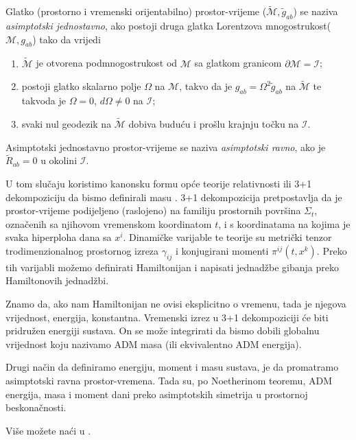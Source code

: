 \begin{mydef*}
Glatko (prostorno i vremenski orijentabilno) prostor-vrijeme ($\tilde{\mathcal{M}},\tilde{g}_{ab}$) se naziva \textit{asimptotski jednostavno}, ako postoji druga glatka Lorentzova mnogostrukost\newline ($\mathcal{M},g_{ab}$) tako da vrijedi

\begin{enumerate}
\itemsep-1.5em 
\item $\tilde{\mathcal{M}}$ je otvorena podmnogostrukost od $\mathcal{M}$ sa glatkom granicom $\partial\mathcal{M}=\mathscr{I}$;\\
\item postoji glatko skalarno polje $\Omega$ na $\mathcal{M}$, takvo da je $g_{ab}=\Omega^2\tilde{g}_{ab}$ na $\tilde{\mathcal{M}}$ te takvo\newline da je $\Omega=0$, $d\Omega\neq 0$ na $\mathscr{I}$;\\
\item svaki nul geodezik na $\tilde{\mathcal{M}}$ dobiva buduću i prošlu krajnju točku na $\mathscr{I}$.
\end{enumerate}

Asimptotski jednostavno prostor-vrijeme se naziva \textit{asimptotski ravno}, ako je $\tilde{R}_{ab}=0$ u okolini $\mathscr{I}$.
\end{mydef*}

\noindent U tom slučaju koristimo kanonsku formu opće teorije relativnosti ili 3+1 dekompoziciju da bismo definirali masu \citep{Arnowitt:1962hi}. 3+1 dekompozicija pretpostavlja da je prostor-vrijeme podijeljeno (raslojeno) na familiju prostornih površina $\Sigma_t$, označenih sa njihovom vremenskom koordinatom $t$, i s koordinatama na kojima je svaka hiperploha dana sa $x^i$. Dinamičke varijable te teorije su metrički tenzor trodimenzionalnog prostornog izreza $\gamma_{ij}$ i konjugirani momenti $\pi^{ij}(t,x^k)$. Preko tih varijabli možemo definirati Hamiltonijan i napisati jednadžbe gibanja preko Hamiltonovih jednadžbi.

\noindent Znamo da, ako nam Hamiltonijan ne ovisi eksplicitno o vremenu, tada je njegova vrijednost, energija, konstantna. Vremenski izrez u 3+1 dekompoziciji će biti pridružen energiji sustava. On se može integrirati da bismo dobili globalnu vrijednost koju nazivamo ADM masa (ili ekvivalentno ADM energija).

\noindent Drugi način da definiramo energiju, moment i masu sustava, je da promatramo asimptotski ravna prostor-vremena. Tada su, po Noetherinom teoremu, ADM energija, masa i moment dani preko asimptotskih simetrija u prostornoj beskonačnosti.

\noindent Više možete naći u \citep{lrr-2004-1}.





